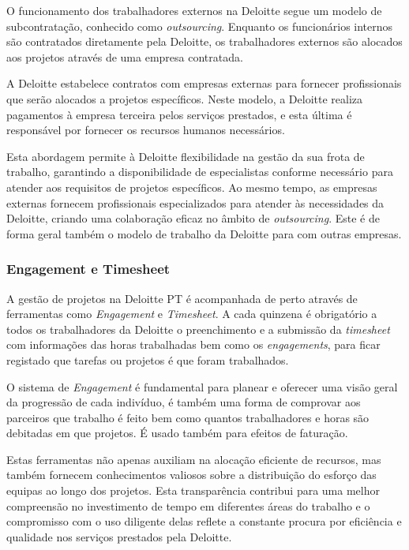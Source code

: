             O funcionamento dos trabalhadores externos na Deloitte segue um modelo de subcontratação, conhecido como \textit{outsourcing}. Enquanto os funcionários internos são contratados diretamente pela Deloitte, os trabalhadores externos são alocados aos projetos através de uma empresa contratada.
            
            A Deloitte estabelece contratos com empresas externas para fornecer profissionais que serão alocados a projetos específicos. Neste modelo, a Deloitte realiza pagamentos à empresa terceira pelos serviços prestados, e esta última é responsável por fornecer os recursos humanos necessários.
            
            Esta abordagem permite à Deloitte flexibilidade na gestão da sua frota de trabalho, garantindo a disponibilidade de especialistas conforme necessário para atender aos requisitos de projetos específicos. Ao mesmo tempo, as empresas externas fornecem profissionais especializados para atender às necessidades da Deloitte, criando uma colaboração eficaz no âmbito de \textit{outsourcing}. Este é de forma geral também o modelo de trabalho da Deloitte para com outras empresas.

        \subsubsection{Engagement e Timesheet}\label{subsub:enga_timesheet}

            A gestão de projetos na Deloitte PT é acompanhada de perto através de ferramentas como \textit{Engagement} e \textit{Timesheet}. A cada quinzena é obrigatório a todos os trabalhadores da Deloitte o preenchimento e a submissão da \textit{timesheet} com informações das horas trabalhadas bem como os \textit{engagements}, para ficar registado que tarefas ou projetos é que foram trabalhados.
            
            O sistema de \textit{Engagement} é fundamental para planear e oferecer uma visão geral da progressão de cada indivíduo, é também uma forma de comprovar aos parceiros que trabalho é feito bem como quantos trabalhadores e horas são debitadas em que projetos. É usado também para efeitos de faturação.

            Estas ferramentas não apenas auxiliam na alocação eficiente de recursos, mas também fornecem conhecimentos valiosos sobre a distribuição do esforço das equipas ao longo dos projetos. Esta transparência contribui para uma melhor compreensão no investimento de tempo em diferentes áreas do trabalho e o compromisso com o uso diligente delas reflete a constante procura por eficiência e qualidade nos serviços prestados pela Deloitte.


